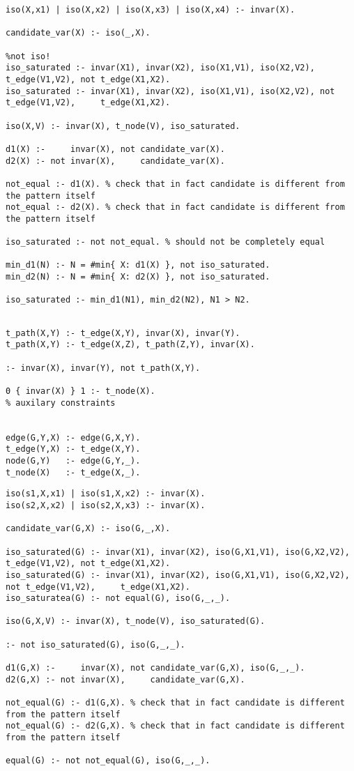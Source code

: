 \documentclass{article}
\theoremstyle{definition}
\begin{document}
\begin{lstlisting}[caption=Canonicity template-based check]
iso(X,x1) | iso(X,x2) | iso(X,x3) | iso(X,x4) :- invar(X).

candidate_var(X) :- iso(_,X).

%not iso!
iso_saturated :- invar(X1), invar(X2), iso(X1,V1), iso(X2,V2),     t_edge(V1,V2), not t_edge(X1,X2). 
iso_saturated :- invar(X1), invar(X2), iso(X1,V1), iso(X2,V2), not t_edge(V1,V2),     t_edge(X1,X2).
 
iso(X,V) :- invar(X), t_node(V), iso_saturated.

d1(X) :-     invar(X), not candidate_var(X). 
d2(X) :- not invar(X),     candidate_var(X).

not_equal :- d1(X). % check that in fact candidate is different from the pattern itself
not_equal :- d2(X). % check that in fact candidate is different from the pattern itself

iso_saturated :- not not_equal. % should not be completely equal

min_d1(N) :- N = #min{ X: d1(X) }, not iso_saturated.
min_d2(N) :- N = #min{ X: d2(X) }, not iso_saturated.

iso_saturated :- min_d1(N1), min_d2(N2), N1 > N2.
\end{lstlisting}

\begin{lstlisting}[caption=Auxilary predicates -- probably should be moved to appendix]
%selects subpattern

t_path(X,Y) :- t_edge(X,Y), invar(X), invar(Y).
t_path(X,Y) :- t_edge(X,Z), t_path(Z,Y), invar(X).

:- invar(X), invar(Y), not t_path(X,Y).

0 { invar(X) } 1 :- t_node(X).
% auxilary constraints


edge(G,Y,X) :- edge(G,X,Y).
t_edge(Y,X) :- t_edge(X,Y).
node(G,Y)   :- edge(G,Y,_).
t_node(X)   :- t_edge(X,_).
\end{lstlisting}

\begin{lstlisting}[caption=Canonicity previous solution isomorphism check]
iso(s1,X,x1) | iso(s1,X,x2) :- invar(X).
iso(s2,X,x2) | iso(s2,X,x3) :- invar(X).

candidate_var(G,X) :- iso(G,_,X).

iso_saturated(G) :- invar(X1), invar(X2), iso(G,X1,V1), iso(G,X2,V2),     t_edge(V1,V2), not t_edge(X1,X2). 
iso_saturated(G) :- invar(X1), invar(X2), iso(G,X1,V1), iso(G,X2,V2), not t_edge(V1,V2),     t_edge(X1,X2). 
iso_saturatea(G) :- not equal(G), iso(G,_,_). 

iso(G,X,V) :- invar(X), t_node(V), iso_saturated(G).

:- not iso_saturated(G), iso(G,_,_).

d1(G,X) :-     invar(X), not candidate_var(G,X), iso(G,_,_).
d2(G,X) :- not invar(X),     candidate_var(G,X).

not_equal(G) :- d1(G,X). % check that in fact candidate is different from the pattern itself
not_equal(G) :- d2(G,X). % check that in fact candidate is different from the pattern itself

equal(G) :- not not_equal(G), iso(G,_,_).
\end{lstlisting}
\end{document}
